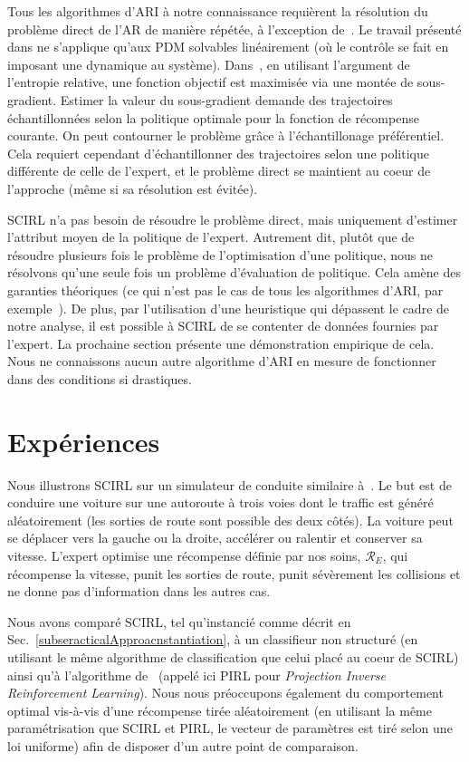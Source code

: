 \documentclass[french,utf8]{./hermes-journal}
\newcommand{\R}{\mathcal{R}}
\begin{document}
Tous les algorithmes d'ARI à notre connaissance requièrent la résolution du problème direct de l'AR de manière répétée, à l'exception de~\cite{Dvi010,boularia011}.
Le travail présenté dans \cite{Dvi010} ne s'applique qu'aux PDM solvables linéairement (où le contrôle se fait en imposant une dynamique au système).
Dans~\cite{boularia011}, en utilisant l'argument de l'entropie relative, une fonction objectif est maximisée via une montée de sous-gradient. Estimer la valeur du sous-gradient demande des trajectoires échantillonnées selon la politique optimale pour la fonction de récompense courante. On peut contourner le problème grâce à l'échantillonage préférentiel. Cela requiert cependant d'échantillonner des trajectoires selon une politique différente de celle de l'expert, et le problème direct se maintient au coeur de l'approche (même si sa résolution est évitée).

SCIRL n'a pas besoin de résoudre le problème direct, mais uniquement d'estimer l'attribut moyen de la politique de l'expert. Autrement dit, plutôt que de résoudre plusieurs fois le problème de l'optimisation d'une politique, nous ne résolvons qu'une seule fois un problème d'évaluation de politique. Cela amène des garanties théoriques (ce qui n'est pas le cas de tous les algorithmes d'ARI, par exemple~\cite{boularia011}). De plus, par l'utilisation d'une heuristique qui dépassent le cadre de notre analyse, il est possible à SCIRL de se contenter de données fournies par l'expert. La prochaine section présente une démonstration empirique de cela. Nous ne connaissons aucun autre algorithme d'ARI en mesure de fonctionner dans des conditions si drastiques.


\section{Expériences}
\label{sexperiments}

Nous illustrons SCIRL sur un simulateur de conduite similaire à~\cite{Abbee004,Sye00ame}.  Le but est de conduire une voiture sur une autoroute à trois voies dont le traffic est généré aléatoirement (les sorties de route sont possible des deux côtés). La voiture peut se déplacer vers la gauche ou la droite, accélérer ou ralentir et conserver sa vitesse. L'expert optimise une récompense définie par nos soins, $\R_E$, qui récompense la vitesse, punit les sorties de route, punit sévèrement les collisions et ne donne pas d'information dans les autres cas.

Nous avons comparé SCIRL, tel qu'instancié comme décrit en
Sec.~\ref{subseracticalApproacnstantiation}, à un classifieur non structuré (en utilisant le même algorithme de classification que celui placé au coeur de SCIRL) ainsi qu'à l'algorithme de~\cite{Abbee004} (appelé ici PIRL pour \emph{
Projection Inverse Reinforcement Learning}). Nous nous préoccupons également du comportement optimal vis-à-vis d'une récompense tirée aléatoirement (en utilisant la même paramétrisation que SCIRL et PIRL, le vecteur de paramètres est tiré selon une loi uniforme) afin de disposer d'un autre point de comparaison.
\end{document}
